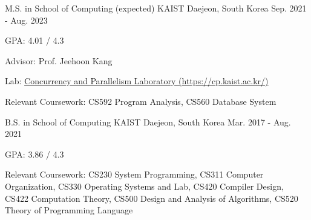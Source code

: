 

\begin{cventries}

  \cventry
    {M.S. in School of Computing (expected)} %
    {KAIST} %
    {Daejeon, South Korea} %
    {Sep. 2021 - Aug. 2023} %
    {
      \begin{cvitems} %
        \item {GPA: 4.01 / 4.3}
        \item {Advisor: Prof. Jeehoon Kang}
        \item {Lab: \href{https://cp.kaist.ac.kr/}{Concurrency and Parallelism Laboratory (https://cp.kaist.ac.kr/)} }
        \item {Relevant Coursework: CS592 Program Analysis, CS560 Database System}
      \end{cvitems}
    }

  \cventry
    {B.S. in School of Computing} %
    {KAIST} %
    {Daejeon, South Korea} %
    {Mar. 2017 - Aug. 2021} %
    {
      \begin{cvitems} %
        \item {GPA: 3.86 / 4.3}
        \item {Relevant Coursework: CS230 System Programming, CS311 Computer Organization, CS330 Operating Systems and Lab, CS420 Compiler Design, CS422 Computation Theory, CS500 Design and Analysis of Algorithms, CS520 Theory of Programming Language}
      \end{cvitems}
    }
\end{cventries}
